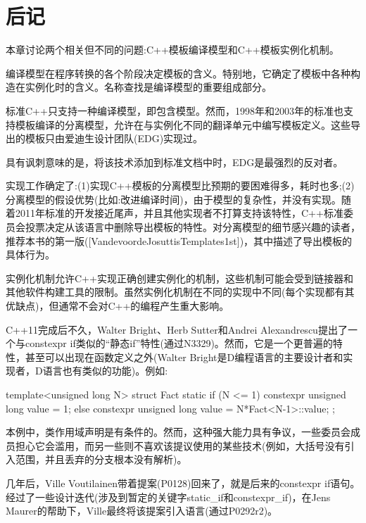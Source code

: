 \section{后记}
本章讨论两个相关但不同的问题:C++模板编译模型和C++模板实例化机制。

编译模型在程序转换的各个阶段决定模板的含义。特别地，它确定了模板中各种构造在实例化时的含义。名称查找是编译模型的重要组成部分。

标准C++只支持一种编译模型，即包含模型。然而，1998年和2003年的标准也支持模板编译的分离模型，允许在与实例化不同的翻译单元中编写模板定义。这些导出的模板只由爱迪生设计团队(EDG)实现过。

\begin{notice}
具有讽刺意味的是，将该技术添加到标准文档中时，EDG是最强烈的反对者。
\end{notice}

实现工作确定了:(1)实现C++模板的分离模型比预期的要困难得多，耗时也多;(2)分离模型的假设优势(比如:改进编译时间)，由于模型的复杂性，并没有实现。随着2011年标准的开发接近尾声，并且其他实现者不打算支持该特性，C++标准委员会投票决定从该语言中删除导出模板的特性。对分离模型的细节感兴趣的读者，推荐本书的第一版([VandevoordeJosuttisTemplates1st])，其中描述了导出模板的具体行为。

实例化机制允许C++实现正确创建实例化的机制，这些机制可能会受到链接器和其他软件构建工具的限制。虽然实例化机制在不同的实现中不同(每个实现都有其优缺点)，但通常不会对C++的编程产生重大影响。

C++11完成后不久，Walter Bright、Herb Sutter和Andrei Alexandrescu提出了一个与constexpr if类似的“静态if”特性(通过N3329)。然而，它是一个更普遍的特性，甚至可以出现在函数定义之外(Walter Bright是D编程语言的主要设计者和实现者，D语言也有类似的功能)。例如:

\begin{cpp}
template<unsigned long N>
struct Fact {
	static if (N <= 1) {
		constexpr unsigned long value = 1;
	} else {
		constexpr unsigned long value = N*Fact<N-1>::value;
	}
};
\end{cpp}

本例中，类作用域声明是有条件的。然而，这种强大能力具有争议，一些委员会成员担心它会滥用，而另一些则不喜欢该提议使用的某些技术(例如，大括号没有引入范围，并且丢弃的分支根本没有解析)。

几年后，Ville Voutilainen带着提案(P0128)回来了，就是后来的constexpr if语句。经过了一些设计迭代(涉及到暂定的关键字static\_if和constexpr\_if)，在Jens Maurer的帮助下，Ville最终将该提案引入语言(通过P0292r2)。




